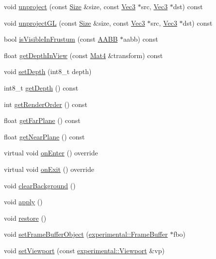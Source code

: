 \begin{DoxyCompactItemize}
void \hyperlink{classCamera_a48a0dab2e51ef11a166e650224e23419}{unproject} (const \hyperlink{classSize}{Size} \&size, const \hyperlink{classVec3}{Vec3} $\ast$src, \hyperlink{classVec3}{Vec3} $\ast$dst) const
\item 
void \hyperlink{classCamera_a2cdbc6f2403ea1f7213e5af66e31f37c}{unproject\+GL} (const \hyperlink{classSize}{Size} \&size, const \hyperlink{classVec3}{Vec3} $\ast$src, \hyperlink{classVec3}{Vec3} $\ast$dst) const
\item 
bool \hyperlink{classCamera_ad962c084c9de231d820b981f4b5846c9}{is\+Visible\+In\+Frustum} (const \hyperlink{classAABB}{A\+A\+BB} $\ast$aabb) const
\item 
float \hyperlink{classCamera_a5b38e0d536fb4773aaad12285634b227}{get\+Depth\+In\+View} (const \hyperlink{classMat4}{Mat4} \&transform) const
\item 
void \hyperlink{classCamera_a361809c317aebb2785ffbda7836e25ff}{set\+Depth} (int8\+\_\+t depth)
\item 
int8\+\_\+t \hyperlink{classCamera_afeacc2e59eb6cc6e32d55673f0c92ada}{get\+Depth} () const
\item 
int \hyperlink{classCamera_a126d10fabc05a9debd3c134f75dc0c14}{get\+Render\+Order} () const
\item 
float \hyperlink{classCamera_ae3582b9b0a37d8d3351f6a1fc5a9b45c}{get\+Far\+Plane} () const
\item 
float \hyperlink{classCamera_a06c0abe6144c4b19aa68935134d15c5c}{get\+Near\+Plane} () const
\item 
virtual void \hyperlink{classCamera_a6d316bcfec816212b0f3cfdf1b41b820}{on\+Enter} () override
\item 
virtual void \hyperlink{classCamera_a21080d4de388ac7b9a02ccf77aaacf92}{on\+Exit} () override
\item 
void \hyperlink{classCamera_ab343c58b5c9ad180b3b11bb42a32920c}{clear\+Background} ()
\item 
void \hyperlink{classCamera_a767aa79833180926e267f9ec82c44577}{apply} ()
\item 
void \hyperlink{classCamera_a5e2265707fe1a6e67e06a2f7d2893b74}{restore} ()
\item 
void \hyperlink{classCamera_a17b4f5537c83a29f8a7d809859e690a4}{set\+Frame\+Buffer\+Object} (\hyperlink{classexperimental_1_1FrameBuffer}{experimental\+::\+Frame\+Buffer} $\ast$fbo)
\item 
void \hyperlink{classCamera_a3070783685089524b0fc5b38d9623b9e}{set\+Viewport} (const \hyperlink{structexperimental_1_1Viewport}{experimental\+::\+Viewport} \&vp)

\end{DoxyCompactItemize}
